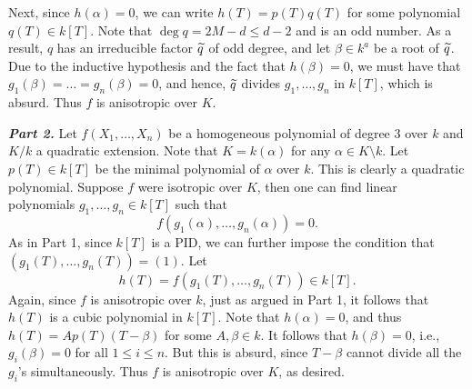 \begin{exercise}
    Next, since $h(\alpha) = 0$, we can write $h(T) = p(T)q(T)$ for some polynomial $q(T)\in k[T]$. Note that $\deg q = 2M - d\le d - 2$ and is an odd number. As a result, $q$ has an irreducible factor $\widetilde{q}$ of odd degree, and let $\beta\in k^a$ be a root of $\widetilde{q}$. Due to the inductive hypothesis and the fact that $h(\beta) = 0$, we must have that $g_1(\beta) = \dots = g_n(\beta) = 0$, and hence, $\widetilde{q}$ divides $g_1,\dots, g_n$ in $k[T]$, which is absurd. Thus $f$ is anisotropic over $K$.

    \textbf{\emph{Part 2.}} Let $f(X_1,\dots,X_n)$ be a homogeneous polynomial of degree $3$ over $k$ and $K/k$ a quadratic extension. Note that $K = k(\alpha)$ for any $\alpha\in K\setminus k$. Let $p(T)\in k[T]$ be the minimal polynomial of $\alpha$ over $k$. This is clearly a quadratic polynomial. Suppose $f$ were isotropic over $K$, then one can find linear polynomials $g_1,\dots, g_n\in k[T]$ such that 
    \begin{equation*}
        f(g_1(\alpha),\dots,g_n(\alpha)) = 0.
    \end{equation*}
    As in Part 1, since $k[T]$ is a PID, we can further impose the condition that $(g_1(T),\dots,g_n(T)) = (1)$. Let 
    \begin{equation*}
        h(T) = f(g_1(T),\dots,g_n(T))\in k[T].
    \end{equation*}
    Again, since $f$ is anisotropic over $k$, just as argued in Part 1, it follows that $h(T)$ is a cubic polynomial in $k[T]$. Note that $h(\alpha) = 0$, and thus $h(T) = A p(T)(T - \beta)$ for some $A,\beta\in k$. It follows that $h(\beta) = 0$, i.e., $g_i(\beta) = 0$ for all $1\le i\le n$. But this is absurd, since $T - \beta$ cannot divide all the $g_i$'s simultaneously. Thus $f$ is anisotropic over $K$, as desired.
\end{exercise}

